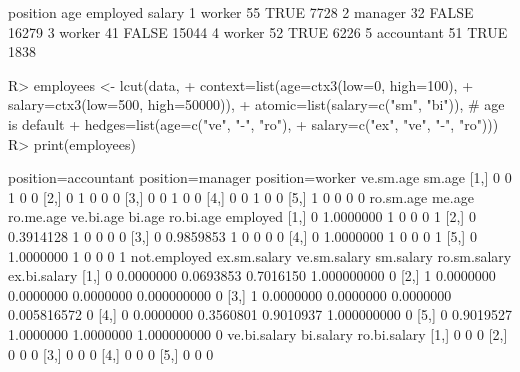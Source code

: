 \documentclass{article}\usepackage[]{graphicx}\usepackage[]{color}
\begin{document}
\begin{Schunk}
% --begin: "lcut.data.frame2"
\begin{Soutput}
    position age employed salary
1     worker  55     TRUE   7728
2    manager  32    FALSE  16279
3     worker  41    FALSE  15044
4     worker  52     TRUE   6226
5 accountant  51     TRUE   1838
\end{Soutput}
\begin{Sinput}
R> employees <- lcut(data,
+                    context=list(age=ctx3(low=0, high=100),
+                                 salary=ctx3(low=500, high=50000)),
+                    atomic=list(salary=c("sm", "bi")), # age is default
+                    hedges=list(age=c("ve", "-", "ro"),
+                                salary=c("ex", "ve", "-", "ro")))
R> print(employees)
\end{Sinput}
\begin{Soutput}
     position=accountant position=manager position=worker ve.sm.age sm.age
[1,]                   0                0               1         0      0
[2,]                   0                1               0         0      0
[3,]                   0                0               1         0      0
[4,]                   0                0               1         0      0
[5,]                   1                0               0         0      0
     ro.sm.age    me.age ro.me.age ve.bi.age bi.age ro.bi.age employed
[1,]         0 1.0000000         1         0      0         0        1
[2,]         0 0.3914128         1         0      0         0        0
[3,]         0 0.9859853         1         0      0         0        0
[4,]         0 1.0000000         1         0      0         0        1
[5,]         0 1.0000000         1         0      0         0        1
     not.employed ex.sm.salary ve.sm.salary sm.salary ro.sm.salary ex.bi.salary
[1,]            0    0.0000000    0.0693853 0.7016150  1.000000000            0
[2,]            1    0.0000000    0.0000000 0.0000000  0.000000000            0
[3,]            1    0.0000000    0.0000000 0.0000000  0.005816572            0
[4,]            0    0.0000000    0.3560801 0.9010937  1.000000000            0
[5,]            0    0.9019527    1.0000000 1.0000000  1.000000000            0
     ve.bi.salary bi.salary ro.bi.salary
[1,]            0         0            0
[2,]            0         0            0
[3,]            0         0            0
[4,]            0         0            0
[5,]            0         0            0
\end{Soutput}
%
% --end: "lcut.data.frame2"
\end{Schunk}
\end{document}
